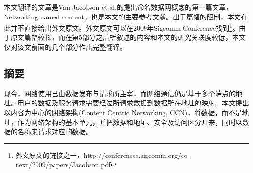 % 
%
%
% 
%

\par
本文翻译的文章是Van Jacobson et al.的提出命名数据网概念的第一篇文章，Networking named content。也是本文的主要参考文献。出于篇幅的限制，本文在此并不直接给出外文原文。外文原文可以在2009年Sigcomm Conference找到\footnote{外文原文的链接之一，http://conferences.sigcomm.org/co-next/2009/papers/Jacobson.pdf}。由于原文篇幅较长，而在第5部分之后所叙述的内容和本文的研究关联度较低，本文仅对该文前面的几个部分作出完整翻译。
\subsection*{摘要}
\par
现今，网络使用已由数据发布与请求所主宰，而网络通信仍是基于多个端点的地址。用户的数据及服务请求需要经过所请求数据到数据所在地址的映射。本文提出以内容为中心的网络架构(Content Centric Networking, CCN)，将数据，而不是地址，作为网络架构的基本单元，并把数据和地址、安全及访问区分开来，同时以数据的名称来请求对应的数据。
\par
